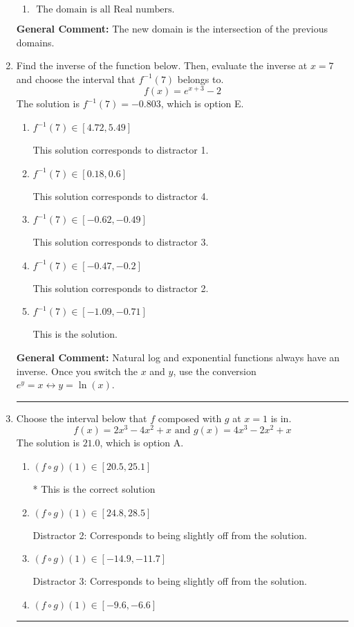\documentclass{extbook}[14pt]
\newcommand{\litem}[1]{\item #1

\rule{\textwidth}{0.4pt}}
\begin{document}
\begin{enumerate}
{\begin{enumerate}[label=\Alph*.]
\item \( \text{ The domain is all Real numbers. } \)


\end{enumerate}

\textbf{General Comment:} The new domain is the intersection of the previous domains.
}
\litem{
Find the inverse of the function below. Then, evaluate the inverse at $x = 7$ and choose the interval that $f^{-1}(7)$ belongs to.
\[ f(x) = e^{x+3}-2 \]
The solution is \( f^{-1}(7) = -0.803 \), which is option E.\begin{enumerate}[label=\Alph*.]
\item \( f^{-1}(7) \in [4.72, 5.49] \)

 This solution corresponds to distractor 1.
\item \( f^{-1}(7) \in [0.18, 0.6] \)

 This solution corresponds to distractor 4.
\item \( f^{-1}(7) \in [-0.62, -0.49] \)

 This solution corresponds to distractor 3.
\item \( f^{-1}(7) \in [-0.47, -0.2] \)

 This solution corresponds to distractor 2.
\item \( f^{-1}(7) \in [-1.09, -0.71] \)

 This is the solution.
\end{enumerate}

\textbf{General Comment:} Natural log and exponential functions always have an inverse. Once you switch the $x$ and $y$, use the conversion $ e^y = x \leftrightarrow y=\ln(x)$.
}
\litem{
Choose the interval below that $f$ composed with $g$ at $x=1$ is in.
\[ f(x) = 2x^{3} -4 x^{2} +x \text{ and } g(x) = 4x^{3} -2 x^{2} +x \]
The solution is \( 21.0 \), which is option A.\begin{enumerate}[label=\Alph*.]
\item \( (f \circ g)(1) \in [20.5, 25.1] \)

* This is the correct solution
\item \( (f \circ g)(1) \in [24.8, 28.5] \)

 Distractor 2: Corresponds to being slightly off from the solution.
\item \( (f \circ g)(1) \in [-14.9, -11.7] \)

 Distractor 3: Corresponds to being slightly off from the solution.
\item \( (f \circ g)(1) \in [-9.6, -6.6] \)


\end{enumerate}}
\end{enumerate}
\end{document}

